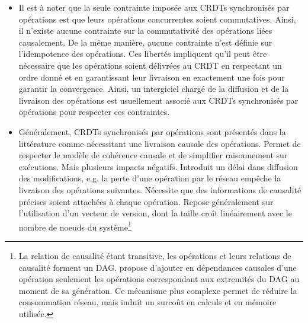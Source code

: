 \documentclass[12pt]{thesul}
\newcommand{\eg}{e.g. }
\begin{document}
\begin{itemize}
    Ensuite, l'expressivité des opérations permet de proposer plus simplement des algorithmes efficaces pour leur intégration par rapport aux modifications équivalentes dans les \acp{CRDT} synchronisés par états.
    Par exemple, la suppression d'un élément dans un Ensemble se traduit en une opération de manière presque littérale, tandis que pour les \acp{CRDT} synchronisés par états, c'est l'absence de l'élément dans l'état qui va rendre compte de la suppression effectuée.
    Ces avantages rendent possible la diffusion et l'intégration une à une des modifications et rendent ainsi utilisables les \acp{CRDT} synchronisés par opérations pour construire des systèmes temps réels.
  \item Il est à noter que la seule contrainte imposée aux \acp{CRDT} synchronisés par opérations est que leurs opérations concurrentes soient commutatives.
    Ainsi, il n'existe aucune contrainte sur la commutativité des opérations liées causalement.
    De la même manière, aucune contrainte n'est définie sur l'idempotence des opérations.
    Ces libertés impliquent qu'il peut être nécessaire que les opérations soient délivrées au \ac{CRDT} en respectant un ordre donné et en garantissant leur livraison en exactement une fois pour garantir la convergence.
    Ainsi, un intergiciel chargé de la diffusion et de la livraison des opérations est usuellement associé aux \acp{CRDT} synchronisés par opérations pour respecter ces contraintes.
  \item Généralement, \acp{CRDT} synchronisés par opérations sont présentés dans la littérature comme nécessitant une livraison causale des opérations.
    Permet de respecter le modèle de cohérence causale et de simplifier raisonnement sur exécutions.
    Mais plusieurs impacts négatifs.
    Introduit un délai dans diffusion des modifications, \eg la perte d'une opération par le réseau empêche la livraison des opérations suivantes.
    Nécessite que des informations de causalité précises soient attachées à chaque opération.
    Repose généralement sur l'utilisation d'un vecteur de version, dont la taille croît linéairement avec le nombre de noeuds du système\footnote{
      La relation de causalité étant transitive, les opérations et leurs relations de causalité forment un DAG.
      \cite{1997-causal-barrier} propose d'ajouter en dépendances causales d'une opération seulement les opérations correspondant aux extremités du DAG au moment de sa génération.
      Ce mécanisme plus complexe permet de réduire la consommation réseau, mais induit un surcoût en calculs et en mémoire utilisée.
}
\end{itemize}
\end{document}
